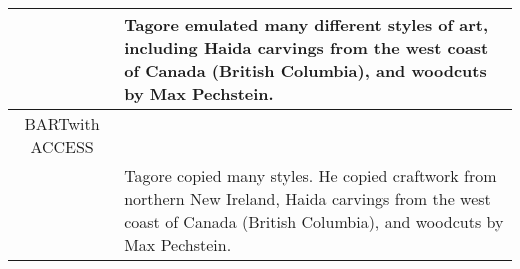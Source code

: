 \documentclass[11pt]{article}
\newcommand{\control}{\textsc{Control Prefixes}\xspace}
\newcommand{\bartl}{BART}
\begin{document}
\begin{table*}[bth!]
\begin{tabular}{c|p{}}
& Tagore emulated many different styles of art, including Haida carvings from the west coast of Canada (British Columbia), and woodcuts by Max Pechstein. \\ \hline
\bartl with ACCESS  \\

& Tagore copied many styles. He copied craftwork from northern New Ireland, Haida carvings from the west coast of Canada (British Columbia), and woodcuts by Max Pechstein.
\\ \midrule \hline



  \end{tabular}
  \caption{\textbf{\emph{Fixed-LM} vs fine-tuned controlled text simplification}. \control  and \bartl with ACCESS \citep{MUSS} generated simplifications chosen from the ASSET Corpus test set. Note, this is one random gold reference out of 10 for each example. The examples shown for \control and \bartl with ACCESS are also randomly selected from one of the five model outputs.\label{tab:app_simpcont}}
    

\end{table*}
\end{document}
